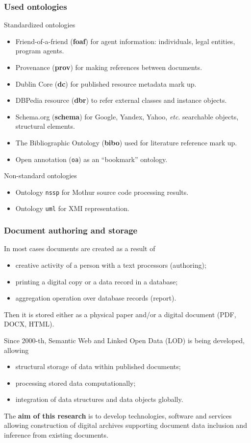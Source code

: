 \documentclass[10pt]{beamer}
\begin{document}
\begin{frame}
  \frametitle{Used ontologies}

  Standardized ontologies

  \begin{itemize}
  \item Friend-of-a-friend (\textbf{foaf}) for agent information: individuals, legal entities, program agents.
  \item Provenance (\textbf{prov}) for making references between documents.
  \item Dublin Core (\textbf{dc}) for published resource metadata mark up.
  \item DBPedia resource (\textbf{dbr}) to refer external classes and instance objects.
  \item Schema.org (\textbf{schema}) for Google, Yandex, Yahoo, \emph{etc}. searchable objects, structural elements.
  \item The Bibliographic Ontology (\textbf{bibo}) used for literature reference mark up.
  \item Open annotation (\texttt{oa}) as an ``bookmark'' ontology.
  \end{itemize}

  Non-standard ontologies

  \begin{itemize}
  \item Ontology \texttt{nssp} for Mothur source code processing results.
  \item Ontology \texttt{uml} for XMI representation.
  \end{itemize}
\end{frame}

\begin{frame}
  \frametitle{Document authoring and storage}
  In most cases documents are created as a result of
  \begin{itemize}
  \item creative activity of a person with a text processors (authoring);
  \item printing a digital copy or a data record in a database;
  \item aggregation operation over database records (report).
  \end{itemize}
  Then it is stored either as a physical paper and/or a digital document (PDF, DOCX, HTML).

  Since 2000-th, Semantic Web and Linked Open Data (LOD) is being developed, allowing
  \begin{itemize}
  \item structural storage of data within published documents;
  \item processing stored data computationally;
  \item integration of data structures and data objects globally.
  \end{itemize}

  The \textbf{aim of this research} is to develop technologies, software and services allowing construction of digital archives supporting document data inclusion and inference from existing documents.
\end{frame}
\end{document}

